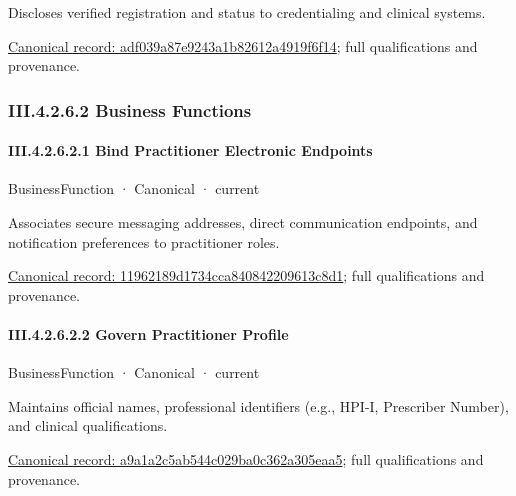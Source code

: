 Discloses verified registration and status to credentialing and clinical systems.


{\footnotesize \href{../../../../../../../continuum/business/business-service/adf039a87e9243a1b82612a4919f6f14.md}{Canonical record: adf039a87e9243a1b82612a4919f6f14}; full qualifications and provenance.}\par
\subsubsection*{III.4.2.6.2 Business Functions}
\label{navigation:III.4.2.6.2}

\paragraph*{III.4.2.6.2.1 Bind Practitioner Electronic Endpoints}
\label{navigation:III.4.2.6.2.1}

\label{element:11962189d1734cca840842209613c8d1}
{\small BusinessFunction · Canonical · current}\par

Associates secure messaging addresses, direct communication endpoints, and notification preferences to practitioner roles.


{\footnotesize \href{../../../../../../../continuum/business/business-function/11962189d1734cca840842209613c8d1.md}{Canonical record: 11962189d1734cca840842209613c8d1}; full qualifications and provenance.}\par
\paragraph*{III.4.2.6.2.2 Govern Practitioner Profile}
\label{navigation:III.4.2.6.2.2}

\label{element:a9a1a2c5ab544c029ba0c362a305eaa5}
{\small BusinessFunction · Canonical · current}\par

Maintains official names, professional identifiers (e.g., HPI-I, Prescriber Number), and clinical qualifications.


{\footnotesize \href{../../../../../../../continuum/business/business-function/a9a1a2c5ab544c029ba0c362a305eaa5.md}{Canonical record: a9a1a2c5ab544c029ba0c362a305eaa5}; full qualifications and provenance.}\par
